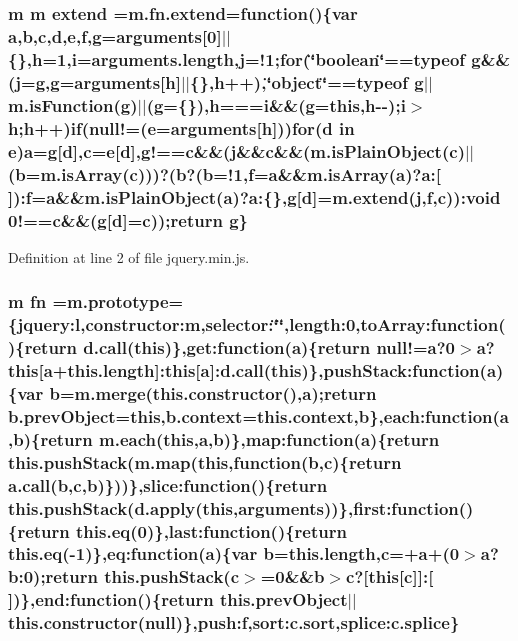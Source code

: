 \hypertarget{a00030_a167947be5252c14d5389d8a01a8c8545}{}
\subsubsection[{extend}]{\setlength{\rightskip}{0pt plus 5cm}m m extend =m.\+fn.\+extend=function()\{var {\bf a},{\bf b},{\bf c},{\bf d},{\bf e},f,g=arguments\mbox{[}0\mbox{]}$\vert$$\vert$\{\},h=1,{\bf i}=arguments.\+length,{\bf j}=!1;for(\char`\"{}boolean\char`\"{}==typeof g\&\&({\bf j}=g,g=arguments\mbox{[}h\mbox{]}$\vert$$\vert$\{\},h++),\char`\"{}object\char`\"{}==typeof g$\vert$$\vert$m.\+is\+Function(g)$\vert$$\vert$(g=\{\}),h==={\bf i}\&\&(g=this,h-\/-\/);{\bf i}$>$h;h++){\bf if}(null!=({\bf e}=arguments\mbox{[}h\mbox{]}))for({\bf d} in {\bf e}){\bf a}=g\mbox{[}{\bf d}\mbox{]},{\bf c}={\bf e}\mbox{[}{\bf d}\mbox{]},g!=={\bf c}\&\&({\bf j}\&\&{\bf c}\&\&(m.\+is\+Plain\+Object({\bf c})$\vert$$\vert$({\bf b}=m.\+is\+Array({\bf c})))?({\bf b}?({\bf b}=!1,f={\bf a}\&\&m.\+is\+Array({\bf a})?a\+:\mbox{[}$\,$\mbox{]})\+:f={\bf a}\&\&m.\+is\+Plain\+Object({\bf a})?a\+:\{\},g\mbox{[}{\bf d}\mbox{]}=m.\+extend({\bf j},f,{\bf c}))\+:void 0!=={\bf c}\&\&(g\mbox{[}{\bf d}\mbox{]}={\bf c}));return g\}}\label{a00030_a167947be5252c14d5389d8a01a8c8545}


Definition at line 2 of file jquery.\+min.\+js.

\hypertarget{a00030_ab2836ee14921cbd6e34ea91a9a99ad66}{}
\subsubsection[{fn}]{\setlength{\rightskip}{0pt plus 5cm}m fn =m.\+prototype=\{jquery\+:l,constructor\+:m,selector\+:\char`\"{}\char`\"{},length\+:0,to\+Array\+:function()\{return d.\+call(this)\},get\+:function({\bf a})\{return null!={\bf a}?0$>${\bf a}?this\mbox{[}{\bf a}+this.\+length\mbox{]}\+:this\mbox{[}{\bf a}\mbox{]}\+:d.\+call(this)\},push\+Stack\+:function({\bf a})\{var {\bf b}=m.\+merge(this.\+constructor(),{\bf a});return b.\+prev\+Object=this,b.\+context=this.\+context,{\bf b}\},each\+:function({\bf a},{\bf b})\{return {\bf m.\+each}(this,{\bf a},{\bf b})\},map\+:function({\bf a})\{return this.\+push\+Stack(m.\+map(this,function({\bf b},{\bf c})\{return a.\+call({\bf b},{\bf c},{\bf b})\}))\},slice\+:function()\{return this.\+push\+Stack(d.\+apply(this,arguments))\},first\+:function()\{return this.\+eq(0)\},last\+:function()\{return this.\+eq(-\/1)\},eq\+:function({\bf a})\{var {\bf b}=this.\+length,{\bf c}=+{\bf a}+(0$>${\bf a}?b\+:0);return this.\+push\+Stack({\bf c}$>$=0\&\&{\bf b}$>${\bf c}?\mbox{[}this\mbox{[}{\bf c}\mbox{]}\mbox{]}\+:\mbox{[}$\,$\mbox{]})\},end\+:function()\{return this.\+prev\+Object$\vert$$\vert$this.\+constructor(null)\},push\+:f,sort\+:c.\+sort,splice\+:c.\+splice\}}\label{a00030_ab2836ee14921cbd6e34ea91a9a99ad66}


